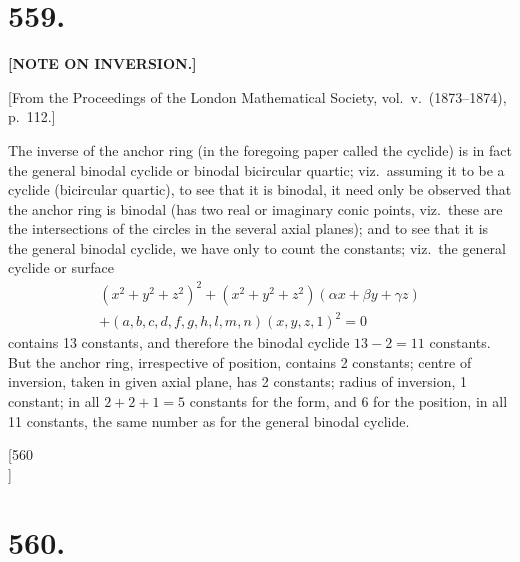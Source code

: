 \documentclass[11pt,a4paper]{book}
\begin{document}
\section*{\textbf{559.}}

\begin{center}
{\large \textbf{[NOTE ON INVERSION.]}}
\end{center}

\begin{flushright}
{\small [From the Proceedings of the London Mathematical Society, vol.\ v.\ (1873--1874), p.\ 112.]}
\end{flushright}

The inverse of the anchor ring (in the foregoing paper called the cyclide) is in fact the general binodal cyclide or binodal bicircular quartic; viz.\ assuming it to be a cyclide (bicircular quartic), to see that it is binodal, it need only be observed that the anchor ring is binodal (has two real or imaginary conic points, viz.\ these are the intersections of the circles in the several axial planes); and to see that it is the general binodal cyclide, we have only to count the constants; viz.\ the general cyclide or surface
\begin{multline*}
(x^2 + y^2 + z^2)^2 + (x^2 + y^2 + z^2)(\alpha x + \beta y + \gamma z)\\
+ (a, b, c, d, f, g, h, l, m, n)(x, y, z, 1)^2 = 0
\end{multline*}
contains 13 constants, and therefore the binodal cyclide $13 - 2 = 11$ constants. But the anchor ring, irrespective of position, contains 2 constants; centre of inversion, taken in given axial plane, has 2 constants; radius of inversion, 1 constant; in all $2 + 2 + 1 = 5$ constants for the form, and 6 for the position, in all 11 constants, the same number as for the general binodal cyclide.


\newpage
\setcounter{page}{19}

\begin{center}
[560\\
]
\end{center}

\section*{\textbf{560.}}
\end{document}
